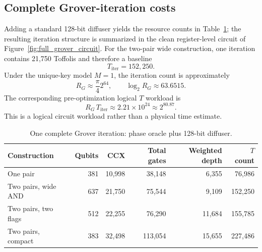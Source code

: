 \documentclass[10pt,a4paper]{article}
\begin{document}
\subsection{Complete Grover-iteration costs}
Adding a standard 128-bit diffuser yields the resource counts in Table~\ref{tab:iteration_resources}; the resulting iteration structure is summarized in the clean register-level circuit of Figure~\ref{fig:full_grover_circuit}. For the two-pair wide construction, one iteration contains 21,750 Toffolis and therefore a baseline
\begin{equation}
    T_{\mathrm{iter}}=152{,}250.
\end{equation}
Under the unique-key model $M=1$, the iteration count is approximately
\begin{equation}
    R_G \approx \frac{\pi}{4}2^{64}, \qquad \log_2 R_G\approx63.6515.
\end{equation}
The corresponding pre-optimization logical $T$ workload is
\begin{equation}
    R_G\,T_{\mathrm{iter}} \approx 2.21\times10^{24}\approx2^{80.87}.
    \label{eq:total_t}
\end{equation}
This is a logical circuit workload rather than a physical time estimate.

\begin{table}[t]
\centering
\caption{One complete Grover iteration: phase oracle plus 128-bit diffuser.}
\label{tab:iteration_resources}
\small
\begin{tabular}{lrrrrr}
\toprule
Construction & Qubits & CCX & Total gates & Weighted depth & $T$ count\\
\midrule
One pair & 381 & 10,998 & 38,148 & 6,355 & 76,986\\
Two pairs, wide AND & 637 & 21,750 & 75,544 & 9,109 & 152,250\\
Two pairs, two flags & 512 & 22,255 & 76,290 & 11,684 & 155,785\\
Two pairs, compact & 383 & 32,498 & 113,054 & 15,655 & 227,486\\
\bottomrule
\end{tabular}
\end{table}
\end{document}
